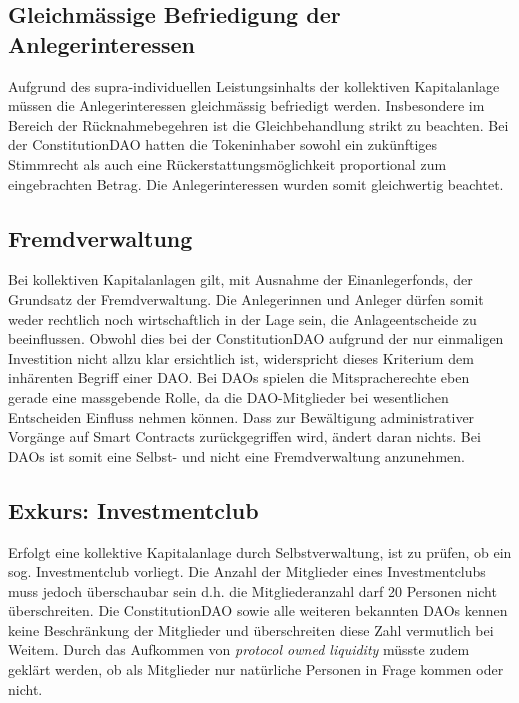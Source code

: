 \documentclass[a4paper,12pt]{report}
\begin{document}
	\subsection{Gleichmässige Befriedigung der Anlegerinteressen}
	\startsubsection
	
	Aufgrund des supra-individuellen Leistungsinhalts der kollektiven Kapitalanlage müssen die Anlegerinteressen gleichmässig befriedigt werden. Insbesondere im Bereich der Rücknahmebegehren ist die Gleichbehandlung strikt zu beachten. Bei der ConstitutionDAO hatten die Tokeninhaber sowohl ein zukünftiges Stimmrecht als auch eine Rückerstattungsmöglichkeit proportional zum eingebrachten Betrag. Die Anlegerinteressen wurden somit gleichwertig beachtet.
	
	\closesection	
	
	\subsection{Fremdverwaltung}
	\startsubsection
	Bei kollektiven Kapitalanlagen gilt, mit Ausnahme der Einanlegerfonds, der Grundsatz der Fremdverwaltung. Die Anlegerinnen und Anleger dürfen somit weder rechtlich noch wirtschaftlich in der Lage sein, die Anlageentscheide zu beeinflussen. Obwohl dies bei der ConstitutionDAO aufgrund der nur einmaligen Investition nicht allzu klar ersichtlich ist, widerspricht dieses Kriterium dem inhärenten Begriff einer DAO. Bei DAOs spielen die Mitspracherechte eben gerade eine massgebende Rolle, da die DAO-Mitglieder bei wesentlichen Entscheiden Einfluss nehmen können. Dass zur Bewältigung administrativer Vorgänge auf Smart Contracts zurückgegriffen wird, ändert daran nichts. Bei DAOs ist somit eine Selbst- und nicht eine Fremdverwaltung anzunehmen.
	\closesection

    \subsection{Exkurs: Investmentclub}
	\startsubsection
	Erfolgt eine kollektive Kapitalanlage durch Selbstverwaltung, ist zu prüfen, ob ein sog. Investmentclub vorliegt. Die Anzahl der Mitglieder eines Investmentclubs muss jedoch überschaubar sein d.h. die Mitgliederanzahl darf 20 Personen nicht überschreiten. Die ConstitutionDAO sowie alle weiteren bekannten DAOs kennen keine Beschränkung der Mitglieder und überschreiten diese Zahl vermutlich bei Weitem. Durch das Aufkommen von \textit{protocol owned liquidity} müsste zudem geklärt werden, ob als Mitglieder nur natürliche Personen in Frage kommen oder nicht.
	\closesection
	
\end{document}
